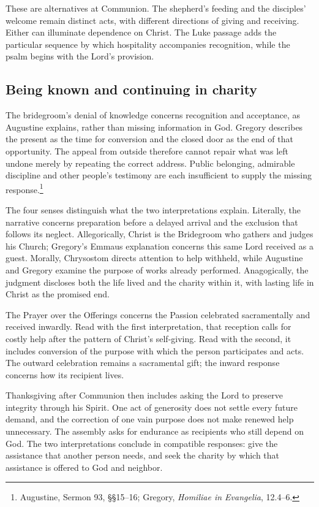 These are alternatives at Communion. The shepherd's feeding and the disciples' welcome remain distinct acts, with different directions of giving and receiving. Either can illuminate dependence on Christ. The Luke passage adds the particular sequence by which hospitality accompanies recognition, while the psalm begins with the Lord's provision.

\subsection{Being known and continuing in charity}
The bridegroom's denial of knowledge concerns recognition and acceptance, as Augustine explains, rather than missing information in God. Gregory describes the present as the time for conversion and the closed door as the end of that opportunity. The appeal from outside therefore cannot repair what was left undone merely by repeating the correct address. Public belonging, admirable discipline and other people's testimony are each insufficient to supply the missing response.\footnote{Augustine, Sermon 93, §§15--16; Gregory, \textit{Homiliae in Evangelia}, 12.4--6.}

The four senses distinguish what the two interpretations explain. Literally, the narrative concerns preparation before a delayed arrival and the exclusion that follows its neglect. Allegorically, Christ is the Bridegroom who gathers and judges his Church; Gregory's Emmaus explanation concerns this same Lord received as a guest. Morally, Chrysostom directs attention to help withheld, while Augustine and Gregory examine the purpose of works already performed. Anagogically, the judgment discloses both the life lived and the charity within it, with lasting life in Christ as the promised end.

The Prayer over the Offerings concerns the Passion celebrated sacramentally and received inwardly. Read with the first interpretation, that reception calls for costly help after the pattern of Christ's self-giving. Read with the second, it includes conversion of the purpose with which the person participates and acts. The outward celebration remains a sacramental gift; the inward response concerns how its recipient lives.

Thanksgiving after Communion then includes asking the Lord to preserve integrity through his Spirit. One act of generosity does not settle every future demand, and the correction of one vain purpose does not make renewed help unnecessary. The assembly asks for endurance as recipients who still depend on God. The two interpretations conclude in compatible responses: give the assistance that another person needs, and seek the charity by which that assistance is offered to God and neighbor.
